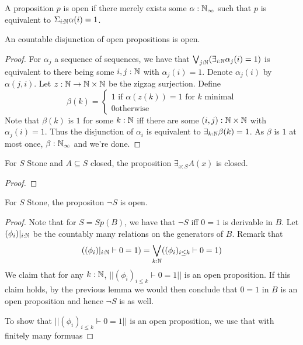 \begin{definition}
  A proposition $p$ is open if there merely exists some $\alpha:\mathbb{N}_\infty$ such that 
  $p$ is equivalent to $\Sigma_{i:\mathbb{N}} \alpha(i) = 1$. 
\end{definition}
\begin{lemma}
  An countable disjunction of open propositions is open. 
\end{lemma}
\begin{proof}
  For $\alpha_j$ a sequence of sequences, 
  we have that $\bigvee_{j:\mathbb{N}}(\exists_{i:\mathbb{N}} \alpha_j(i) = 1)$ 
  is equivalent to there being some $i,j:\mathbb{N}$ with $\alpha_j(i) = 1$. 
  Denote $\alpha_j(i)$ by $\alpha(j,i)$. 
  Let $z:\mathbb{N} \to \mathbb{N} \times \mathbb{N}$ be the zigzag surjection. 
  Define 
  \begin{equation}
    \beta(k) = 
    \begin{cases}
      1 \text{ if } \alpha(z(k)) = 1\text{ for $k$ minimal}\\
      0 \text{otherwise} 
    \end{cases}
  \end{equation}
  Note that $\beta(k)$ is $1$ for some $k:\mathbb{N}$ iff there are some $(i,j):\mathbb{N} \times \mathbb{N}$ 
  with $\alpha_j(i) = 1$. 
  Thus the disjunction of $\alpha_i$ is equivalent to 
  $\exists_{k:\mathbb{N}} \beta(k) = 1$. 
  As $\beta$ is $1$ at most once, $\beta:\mathbb{N}_\infty$ and we're done. 
\end{proof}

\begin{lemma}
  For $S$ Stone and $A\subseteq S$ closed, 
  the proposition $\exists_{x:S} A(x)$ is closed. 
\end{lemma}
\begin{proof}
  
\end{proof}




\begin{lemma}
  For $S$ Stone, the propositon $\neg S$ is open. 
\end{lemma}

\begin{proof}
  Note that for $S = Sp(B)$, we have that $\neg S$ iff $0=1$ is derivable in $B$. 
  Let $(\phi_i)|_{i:\mathbb{N}}$ be the countably many relations on the generators of $B$. 
  Remark that 
  \begin{equation}
    ((\phi_i)|_{i:\mathbb{N}} \vdash 0 = 1 )= \bigvee_{k:\mathbb{N}} ((\phi_i)_{i\leq k} \vdash 0 = 1)
  \end{equation}
  We claim that for any $k:\mathbb{N}$, $||(\phi_i)_{i\leq k} \vdash 0 = 1||$ is an open proposition. 
  If this claim holds, by the previous lemma we would then conclude that $0=1$ in $B$ is an open proposition
  and hence $\neg S$ is as well. 

  To show that $||(\phi_i)_{i\leq k} \vdash 0 = 1||$ is an open proposition, 
  we use that with finitely many formuas


\end{proof}
